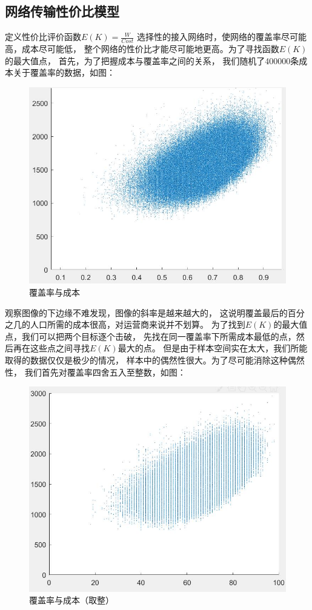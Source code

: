 \documentclass[UTF8,12pt]{ctexart}
\begin{document}
\subsection{网络传输性价比模型}\label{WLCSXJB}
定义性价比评价函数$E(K)=\frac{W}{Cost}$
选择性的接入网络时，使网络的覆盖率尽可能高，成本尽可能低，
整个网络的性价比才能尽可能地更高。为了寻找函数$E(K)$的最大值点，
首先，为了把握成本与覆盖率之间的关系，
我们随机了400000条成本关于覆盖率的数据，如图：
\begin{figure}[H]
    \centering
    \includegraphics[scale=0.38]{400000.jpg}
    \caption{覆盖率与成本}
\end{figure}
观察图像的下边缘不难发现，图像的斜率是越来越大的，
这说明覆盖最后的百分之几的人口所需的成本很高，对运营商来说并不划算。
为了找到$E(K)$的最大值点，我们可以把两个目标逐个击破，
先找在同一覆盖率下所需成本最低的点，然后再在这些点之间寻找$E(K)$最大的点。
但是由于样本空间实在太大，我们所能取得的数据仅仅是极少的情况，
样本中的偶然性很大。为了尽可能消除这种偶然性，
我们首先对覆盖率四舍五入至整数，如图：
\begin{figure}[H]
    \centering
    \includegraphics[scale=0.38]{400000z.jpg}
    \caption{覆盖率与成本（取整）}
\end{figure}
\end{document}
